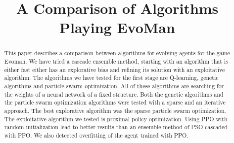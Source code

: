 \documentclass[conference]{IEEEtran}
\begin{document}
    \title{A Comparison of Algorithms Playing EvoMan}

    \author{
        \and
        \and
    }

    \maketitle

    \begin{abstract}
        This paper describes a comparison between algorithms for evolving agents for the game Evoman.
        We have tried a cascade ensemble method, starting with an algorithm that is either fast either has
        an explorative bias and refining its solution with an exploitative algorithm.
        The algorithms we have tested for the first stage are Q-learning, genetic algorithms and particle swarm optimization.
        All of these algorithms are searching for the weights of a neural network of a fixed structure.
        Both the genetic algorithms and the particle swarm optimization algorithms were tested with a sparse and
        an iterative approach.
        The best explorative algorithm was the sparse particle swarm optimization.
        The exploitative algorithm we tested is proximal policy optimization.
        Using PPO with random initialization lead to better results than an ensemble method of PSO cascaded with PPO\@.
        We also detected overfitting of the agent trained with PPO\@.
    \end{abstract}
\end{document}
